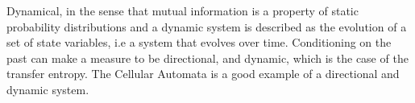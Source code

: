\documentclass[11pt]{article}
\begin{document}
Dynamical, in the sense that mutual information is a property of static probability distributions and a dynamic system is described as the evolution of a set of state variables, i.e a system that evolves over time. Conditioning on the past can make a measure to be directional, and dynamic, which is the case of the transfer entropy. The Cellular Automata is a good example of a directional and dynamic system.\\


	
\end{document}
